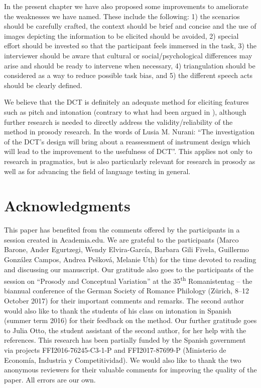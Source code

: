 \documentclass[output=paper]{LSP/langsci}
\begin{document}
In the present chapter we have also proposed some improvements to ameliorate the weaknesses we have named. These include the following: 1) the scenarios should be carefully crafted, the context should be brief and concise and the use of images depicting the information to be elicited should be avoided, 2) special effort should be invested so that the participant feels immersed in the task, 3) the interviewer should be aware that cultural or social/psychological differences may arise and should be ready to intervene when necessary, 4) triangulation should be considered as a way to reduce possible task bias, and 5) the different speech acts should be clearly defined.

We believe that the DCT is definitely an adequate method for eliciting features such as pitch and intonation (contrary to what had been argued in \citealt{Kasper2000}), although further research is needed to directly address the validity/reliability of the method in prosody research. In the words of Lusia M. Nurani: “The investigation of the DCT’s design will bring about a reassessment of instrument design which will lead to the improvement to the usefulness of DCT”\citep[676]{Nurani2009}. This applies not only to research in pragmatics, but is also particularly relevant for research in prosody as well as for advancing the field of language testing in general. 


\section*{Acknowledgments}

This paper has benefited from the comments offered by the par\-ti\-ci\-pants in a session created in Academia.edu. We are grateful to the par\-ti\-ci\-pants (Marco Barone, Ander Egurtzegi, Wendy Elvira-García, Barbara Gili Fivela, Guillermo González Campos, Andrea Pešková, Melanie Uth) for the time devoted to reading and discussing our manuscript. Our gratitude also goes to the par\-ti\-ci\-pants of the session on “Prosody and Conceptual Variation” at the 35\textsuperscript{th} Romanistentag – the biannual conference of the German Society of Romance Philology (Zürich, 8--12 October 2017) for their important comments and remarks. The second author would also like to thank the students of his class on intonation in Spanish (summer term 2016) for their feedback on the method. Our further gratitude goes to Julia Otto, the student assistant of the second author, for her help with the references. This research has been partially funded by the Spanish government via projects FFI2016-76245-C3-1-P and FFI2017-87699-P (Ministerio de Economía, Industria y Competitividad). We would also like to thank the two anonymous reviewers for their valuable comments for improving the quality of the paper. All errors are our own.

{\sloppy
\printbibliography[heading=subbibliography,notkeyword=this]
}
\end{document}
